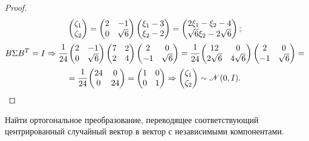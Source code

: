 \begin{proof}	
	\begin{multline} \begin{pmatrix} \zeta_1 \\ \zeta_2 \end{pmatrix}=\begin{pmatrix} 2 & -1 \\ 0 & \sqrt{6} \end{pmatrix}\begin{pmatrix} \xi_1-3 \\ \xi_2-2 \end{pmatrix}=\begin{pmatrix} 2\xi_1-\xi_2-4 \\ \sqrt{6}\xi_2-2\sqrt{6} \end{pmatrix};	
	\\B \Sigma B^T = I \Rightarrow 	
	\cfrac1{24}\begin{pmatrix} 2 & -1 \\ 0 & \sqrt{6} \end{pmatrix}\begin{pmatrix} 7 & 2 \\ 2 & 4 \end{pmatrix}\begin{pmatrix} 2 & 0 \\ -1 & \sqrt{6} \end{pmatrix}=\cfrac1{24}\begin{pmatrix} 12 & 0 \\ 2\sqrt{6} & 4\sqrt{6} \end{pmatrix}\begin{pmatrix} 2 & 0 \\ -1 & \sqrt{6} \end{pmatrix}=\\=\cfrac1{24}\begin{pmatrix} 24 & 0 \\ 0 & 24 \end{pmatrix}=\begin{pmatrix} 1 & 0 \\ 0 & 1 \end{pmatrix}\Rightarrow \begin{pmatrix} \zeta_1 \\ \zeta_2 \end{pmatrix}\sim \mathscr{N}(0, I).	
	\end{multline} 		
\end{proof}


\begin{problem}
	Найти ортогональное преобразование, переводящее соответствующий центрированный случайный вектор в вектор с независимыми компонентами. 
\end{problem}

